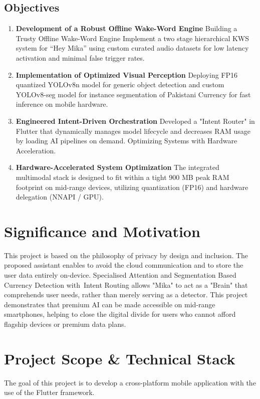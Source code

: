 \documentclass[12pt,a4paper]{report}
\begin{document}
\subsection{Objectives}
\begin{enumerate}
    \item \textbf{Development of a Robust Offline Wake-Word Engine} Building a Trusty Offline Wake-Word Engine Implement a two stage hierarchical KWS system for “Hey Mika” using custom curated audio datasets for low latency activation and minimal false trigger rates.
    \item \textbf{Implementation of Optimized Visual Perception} Deploying FP16 quantized YOLOv8n model for generic object detection and custom YOLOv8-seg model for instance segmentation of Pakistani Currency for fast inference on mobile hardware.
    \item \textbf{Engineered Intent-Driven Orchestration} Developed a "Intent Router" in Flutter that dynamically manages model lifecycle and decreases RAM usage by loading AI pipelines on demand. Optimizing Systems with Hardware Acceleration.
    \item \textbf{Hardware-Accelerated System Optimization} The integrated multimodal stack is designed to fit within a tight 900 MB peak RAM footprint on mid-range devices, utilizing quantization (FP16) and hardware delegation (NNAPI / GPU).
    
\end{enumerate}
 
\section{Significance and Motivation}
This project is based on the philosophy of privacy by design and inclusion. The proposed assistant enables to avoid the cloud communication and to store the user data entirely on-device. Specialised Attention and Segmentation Based Currency Detection with Intent Routing allows "Mika" to act as a "Brain" that comprehends user needs, rather than merely serving as a detector. This project demonstrates that premium AI can be made accessible on mid-range smartphones, helping to close the digital divide for users who cannot afford flagship devices or premium data plans.

\section{Project Scope \& Technical Stack}
The goal of this project is to develop a cross-platform mobile application with the use of the Flutter framework.
\end{document}
